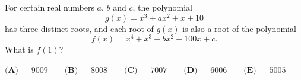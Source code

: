 For certain real numbers $a$, $b$ and $c$, the polynomial
\[g(x)=x^3+ax^2+x+10\]
has three distinct roots, and each root of $g(x)$ is also a root of the polynomial
\[f(x)=x^4+x^3+bx^2+100x+c .\]
What is $f(1)$?

$\textbf{(A) }-9009\qquad\textbf{(B) }-8008\qquad\textbf{(C) }-7007\qquad\textbf{(D) }-6006\qquad\textbf{(E) }-5005$

